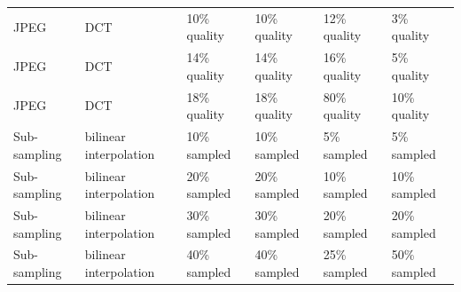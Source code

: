 \begin{table}[]
\begin{tabular}{llllll}
JPEG            & DCT                    & 10\% quality   & 10\% quality & 12\% quality         & 3\% quality    \\
JPEG            & DCT                    & 14\% quality   & 14\% quality & 16\% quality         & 5\% quality    \\
JPEG            & DCT                    & 18\% quality   & 18\% quality & 80\% quality         & 10\% quality   \\
Sub-sampling    & bilinear interpolation & 10\% sampled   & 10\% sampled & 5\% sampled          & 5\% sampled    \\
Sub-sampling    & bilinear interpolation & 20\% sampled   & 20\% sampled & 10\% sampled         & 10\% sampled   \\
Sub-sampling    & bilinear interpolation & 30\% sampled   & 30\% sampled & 20\% sampled         & 20\% sampled   \\
Sub-sampling    & bilinear interpolation & 40\% sampled   & 40\% sampled & 25\% sampled         & 50\% sampled  
\end{tabular}
\end{table}

